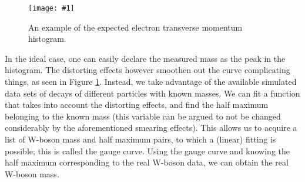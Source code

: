 \documentclass[twocolumn]{article}
\newcommand{\insertFigure}[1]{%
   \texttt{[image: \#1]}%
}
\begin{document}
\begin{figure} [!h]
\centering
\insertFigure{Images/WmassExample.eps}
\caption{An example of the expected electron transverse momentum histogram.\cite{WMassExperiment}}
\label{fig:WmassExample}
\end{figure}
In the ideal case, one can easily declare the measured mass as the peak in the histogram. The distorting effects however smoothen out the curve complicating things, as seen in Figure \ref{fig:WmassExample}. Instead, we take advantage of the available simulated data sets of decays of different particles with known masses. We can fit a function that takes into account the distorting effects, and find the half maximum belonging to the known mass (this variable can be argued to not be changed considerably by the aforementioned smearing effects). This allows us to acquire a list of W-boson mass and half maximum pairs, to which a (linear) fitting is possible; this is called the gauge curve. Using the gauge curve and knowing the half maximum corresponding to the real W-boson data, we can obtain the real W-boson mass. %

\end{document}
